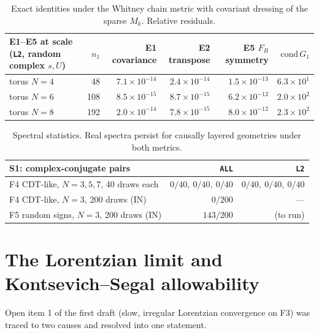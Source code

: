 \documentclass[11pt]{article}
\theoremstyle{definition}
\theoremstyle{plain}
\theoremstyle{remark}
\newcommand{\ttt}[1]{\texttt{#1}}
\begin{document}
\begin{table}[ht]\centering\footnotesize
\begin{tabular}{@{}lrrrrr@{}}
\toprule
E1--E5 at scale (\ttt{L2}, random complex \(s,U\)) & \(n_1\) & E1 covariance & E2 transpose & E5 \(F_B\) symmetry & \(\mathrm{cond}\,G_1\) \\
\midrule
torus \(N=4\) & 48 & \(7.1\times10^{-14}\) & \(2.4\times10^{-14}\) & \(1.5\times10^{-13}\) & \(6.3\times10^{1}\) \\
torus \(N=6\) & 108 & \(8.5\times10^{-15}\) & \(8.7\times10^{-15}\) & \(6.2\times10^{-12}\) & \(2.0\times10^{2}\) \\
torus \(N=8\) & 192 & \(2.0\times10^{-14}\) & \(7.8\times10^{-15}\) & \(8.0\times10^{-12}\) & \(2.3\times10^{2}\) \\
\bottomrule
\end{tabular}
\caption{Exact identities under the Whitney chain metric with covariant dressing of the sparse \(M_k\). Relative residuals.}
\label{tab:E}
\end{table}

\begin{table}[ht]\centering\small
\begin{tabular}{@{}lrr@{}}
\toprule
S1: complex-conjugate pairs & \ttt{ALL} & \ttt{L2} \\
\midrule
F4 CDT-like, \(N=3,5,7\), 40 draws each & \(0/40,\ 0/40,\ 0/40\) & \(0/40,\ 0/40,\ 0/40\) \\
F4 CDT-like, \(N=3\), 200 draws (IN) & \(0/200\) & --- \\
F5 random signs, \(N=3\), 200 draws (IN) & \(143/200\) & (to run) \\
\bottomrule
\end{tabular}
\caption{Spectral statistics. Real spectra persist for causally layered geometries under both metrics.}
\label{tab:S}
\end{table}

\section{The Lorentzian limit and Kontsevich--Segal allowability}\label{sec:ks}

Open item 1 of the first draft (slow, irregular Lorentzian convergence on F3) was traced to two causes and resolved into one statement.
\end{document}
